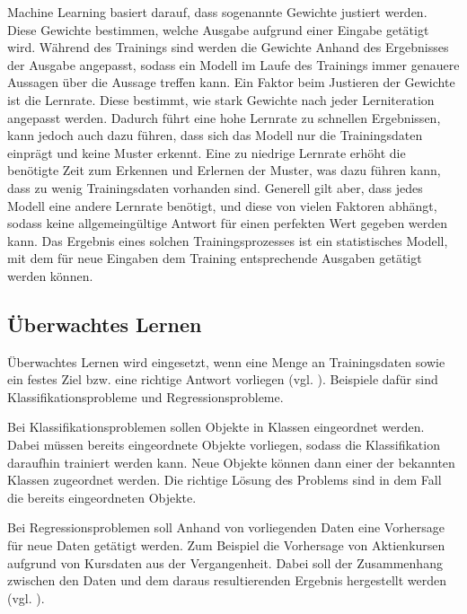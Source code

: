 Machine Learning basiert darauf, dass sogenannte Gewichte justiert werden. Diese Gewichte bestimmen, welche Ausgabe aufgrund einer Eingabe getätigt wird. Während des Trainings sind werden die Gewichte Anhand des Ergebnisses der Ausgabe angepasst, sodass ein Modell im Laufe des Trainings immer genauere Aussagen über die Aussage treffen kann. Ein Faktor beim Justieren der Gewichte ist die Lernrate. Diese bestimmt, wie stark Gewichte nach jeder Lerniteration angepasst werden. Dadurch führt eine hohe Lernrate zu schnellen Ergebnissen, kann jedoch auch dazu führen, dass sich das Modell nur die Trainingsdaten einprägt und keine Muster erkennt. Eine zu niedrige Lernrate erhöht die benötigte Zeit zum Erkennen und Erlernen der Muster, was dazu führen kann, dass zu wenig Trainingsdaten vorhanden sind. Generell gilt aber, dass jedes Modell eine andere Lernrate benötigt, und diese von vielen Faktoren abhängt, sodass keine allgemeingültige Antwort für einen perfekten Wert gegeben werden kann. Das Ergebnis eines solchen Trainingsprozesses ist ein statistisches Modell, mit dem für neue Eingaben dem Training entsprechende Ausgaben getätigt werden können.

\subsection{Überwachtes Lernen}
\label{subsec:ueberwachtesLernen}
Überwachtes Lernen wird eingesetzt, wenn eine Menge an Trainingsdaten sowie ein festes Ziel bzw. eine richtige Antwort vorliegen (vgl. \cite[]{ueberwachtMaschLernen}). Beispiele dafür sind Klassifikationsprobleme und Regressionsprobleme.

Bei Klassifikationsproblemen sollen Objekte in Klassen eingeordnet werden. Dabei müssen bereits eingeordnete Objekte vorliegen, sodass die Klassifikation daraufhin trainiert werden kann. Neue Objekte können dann einer der bekannten Klassen zugeordnet werden. Die richtige Lösung des Problems sind in dem Fall die bereits eingeordneten Objekte.

Bei Regressionsproblemen soll Anhand von vorliegenden Daten eine Vorhersage für neue Daten getätigt werden. Zum Beispiel die Vorhersage von Aktienkursen aufgrund von Kursdaten aus der Vergangenheit. Dabei soll der Zusammenhang zwischen den Daten und dem daraus resultierenden Ergebnis hergestellt werden (vgl. \cite[]{RegKlass}).

